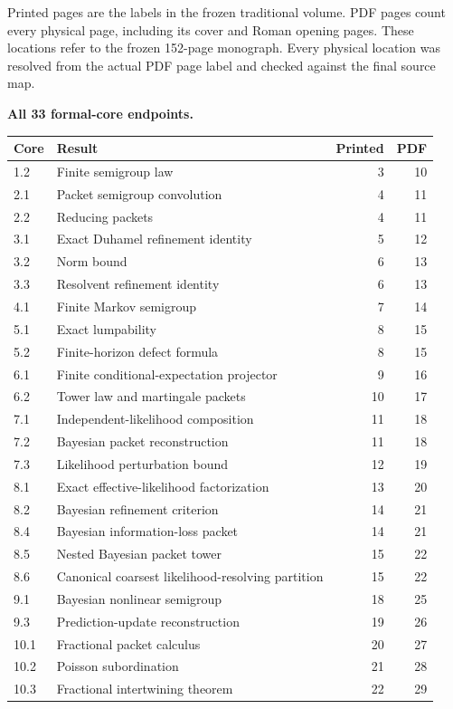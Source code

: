 Printed pages are the labels in the frozen traditional volume. PDF pages count every physical page, including its cover and Roman opening pages. These locations refer to the frozen 152-page monograph. Every physical location was resolved from the actual PDF page label and checked against the final source map.

\textbf{All 33 formal-core endpoints.}
\begin{longtable}{@{}p{.12\linewidth}p{.61\linewidth}rr@{}}\toprule Core & Result & Printed & PDF\\\midrule\endhead
1.2 & Finite semigroup law & 3 & 10\\
2.1 & Packet semigroup convolution & 4 & 11\\
2.2 & Reducing packets & 4 & 11\\
3.1 & Exact Duhamel refinement identity & 5 & 12\\
3.2 & Norm bound & 6 & 13\\
3.3 & Resolvent refinement identity & 6 & 13\\
4.1 & Finite Markov semigroup & 7 & 14\\
5.1 & Exact lumpability & 8 & 15\\
5.2 & Finite-horizon defect formula & 8 & 15\\
6.1 & Finite conditional-expectation projector & 9 & 16\\
6.2 & Tower law and martingale packets & 10 & 17\\
7.1 & Independent-likelihood composition & 11 & 18\\
7.2 & Bayesian packet reconstruction & 11 & 18\\
7.3 & Likelihood perturbation bound & 12 & 19\\
8.1 & Exact effective-likelihood factorization & 13 & 20\\
8.2 & Bayesian refinement criterion & 14 & 21\\
8.4 & Bayesian information-loss packet & 14 & 21\\
8.5 & Nested Bayesian packet tower & 15 & 22\\
8.6 & Canonical coarsest likelihood-resolving partition & 15 & 22\\
9.1 & Bayesian nonlinear semigroup & 18 & 25\\
9.3 & Prediction-update reconstruction & 19 & 26\\
10.1 & Fractional packet calculus & 20 & 27\\
10.2 & Poisson subordination & 21 & 28\\
10.3 & Fractional intertwining theorem & 22 & 29\\

\end{longtable}
